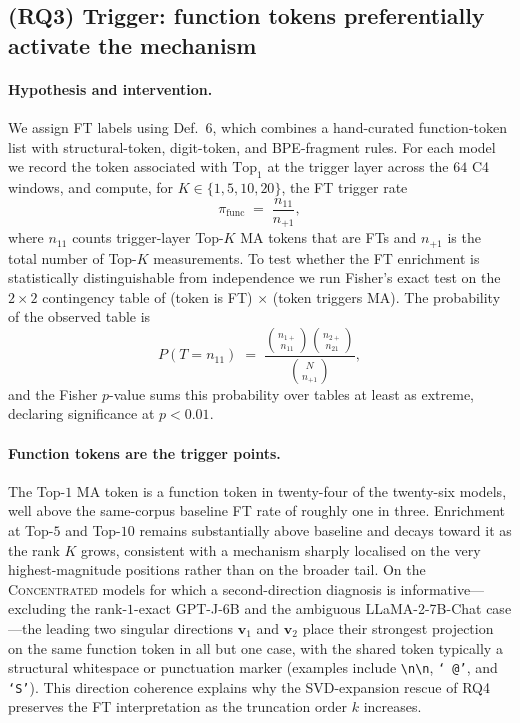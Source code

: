 \documentclass{article}
\newcommand{\topk}{\mathrm{Top}}
\begin{document}
\subsection{(RQ3) Trigger: function tokens preferentially activate the mechanism}
\label{sec:rq3}

\paragraph{Hypothesis and intervention.}
We assign FT labels using Def.~6, which combines a hand-curated
function-token list with structural-token, digit-token, and BPE-fragment
rules. For each model we record the token associated with
$\topk_1$ at the trigger layer across the $64$ C4 windows, and compute,
for $K \in \{1, 5, 10, 20\}$, the FT trigger rate
\begin{equation}
  \label{eq:pi-func}
  \pi_{\text{func}} \;=\; \frac{n_{11}}{n_{+1}},
\end{equation}
where $n_{11}$ counts trigger-layer Top-$K$ MA tokens that are FTs and
$n_{+1}$ is the total number of Top-$K$ measurements. To test whether the
FT enrichment is statistically distinguishable from independence we run
Fisher's exact test on the $2\!\times\!2$ contingency table of (token is
FT) $\times$ (token triggers MA). The probability of the observed table is
\begin{equation}
  \label{eq:fisher-table}
  P(T=n_{11}) \;=\; \frac{\binom{n_{1+}}{n_{11}}\binom{n_{2+}}{n_{21}}}{\binom{N}{n_{+1}}},
\end{equation}
and the Fisher $p$-value sums this probability over tables at least as
extreme, declaring significance at $p < 0.01$.

\paragraph{Function tokens are the trigger points.}
The Top-$1$ MA token is a function token in twenty-four of the
twenty-six models, well above the same-corpus baseline FT rate of
roughly one in three. Enrichment at Top-$5$ and Top-$10$ remains
substantially above baseline and decays toward it as the rank $K$
grows, consistent with a mechanism sharply localised on the very
highest-magnitude positions rather than on the broader tail. On the
\textsc{Concentrated} models for which a second-direction diagnosis is
informative---excluding the rank-$1$-exact GPT-J-6B and the ambiguous
LLaMA-2-7B-Chat case---the leading two singular directions
$\mathbf{v}_1$ and $\mathbf{v}_2$ place their strongest projection on
the same function token in all but one case, with the shared token
typically a structural whitespace or punctuation marker (examples
include \texttt{\textbackslash n\textbackslash n}, \texttt{`~@'}, and
\texttt{`S'}). This direction coherence explains why the SVD-expansion
rescue of RQ4 preserves the FT interpretation as the truncation order
$k$ increases.
\end{document}
